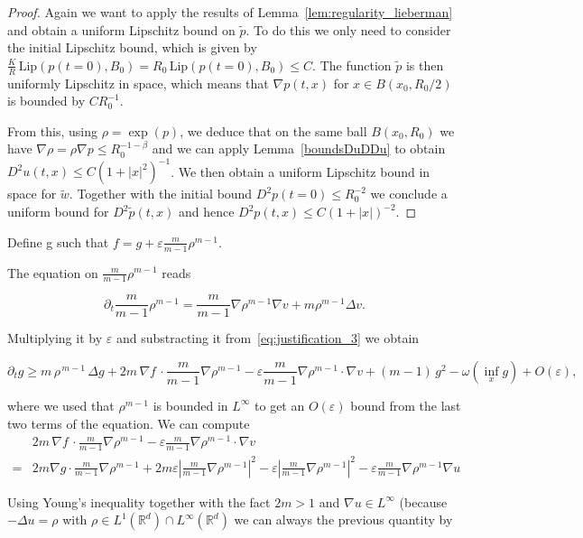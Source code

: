 \documentclass[11pt,a4paper]{article}
\numberwithin{equation}{section}
\newcommand{\R}{{\mathbb{R}}}
\theoremstyle{plain}
\theoremstyle{remark}
\newcommand {\f}{\frac}
\newcommand{\Lip}{\mathrm{Lip}}
\begin{document}
\begin{proof}
Again we want to apply the results of Lemma~\ref{lem:regularity_lieberman} and obtain a uniform Lipschitz bound on $\tilde p$. To do this we only need to consider the initial Lipschitz bound, which is given by $\frac KR\,\Lip(p(t=0), B_0)=R_0\, \Lip(p(t=0), B_0)\leq C$. The function $\tilde p$ is then uniformly Lipschitz in space, which means that $\nabla p(t,x)$ for $x\in B(x_0,R_0/2)$ is bounded by $CR_0^{-1}$.

From this, using $\rho=\exp{(p)}$, we deduce that on the same ball $B(x_0,R_0)$ we have $\nabla \rho=\rho\nabla p\leq R_0^{-1-\beta}$ and we can apply Lemma~\ref{boundsDuDDu}  to obtain $D^2u(t,x)\leq C(1+|x|^2)^{-1}$. We then obtain a uniform Lipschitz bound in space for $\tilde w$. Together with the initial bound $D^2p(t=0)\leq R_0^{-2}$ we conclude a uniform bound for $D^2\tilde p(t,x)$ and hence $D^2 p(t,x)\leq C(1+|x|)^{-2}$.
\qedhere 
\end{proof}


\iffalse

Define g such that $f=g + \varepsilon \f{m}{m-1}\rho^{m-1}$. 

The equation on $\f{m}{m-1}\rho^{m-1}$ reads 

$$
\partial_t \f{m}{m-1}\rho^{m-1} =\f{m}{m-1}\nabla\rho^{m-1}\nabla v + m\rho^{m-1}\Delta v. 
$$

Multiplying it by $\varepsilon$ and substracting it from~\eqref{eq:justification_3} we obtain 

\begin{equation}\label{eq:justificaiton_4}
\partial_t g \ge
  m\,\rho^{\,m-1}\,\Delta g
 +  2m \,\nabla f \,\cdot\f{m}{m-1}\nabla\rho^{m-1}-\varepsilon\f{m}{m-1}\nabla\rho^{m-1}\cdot\nabla v
 + (m-1)\,g^2
  -\omega\left(\inf_{x}g\right) + O(\varepsilon),
\end{equation}

where we used that $\rho^{m-1}$ is bounded in $L^{\infty}$ to get an $O(\varepsilon)$ bound from the last two terms of the equation. We can compute 
\begin{align*}
 &2m \,\nabla f \,\cdot\f{m}{m-1}\nabla\rho^{m-1}-\varepsilon\f{m}{m-1}\nabla\rho^{m-1}\cdot\nabla v
  \\
 =&2m\nabla g\cdot\f{m}{m-1}\nabla\rho^{m-1} + 2m\varepsilon \left|\f{m}{m-1}\nabla \rho^{m-1}\right|^2 -\varepsilon  \left|\f{m}{m-1}\nabla \rho^{m-1}\right|^2 -\varepsilon\f{m}{m-1}\nabla\rho^{m-1}\nabla u
\end{align*}

Using Young's inequality together with the fact $2m>1$ and $\nabla u\in L^{\infty}$ (because $-\Delta u=\rho$ with $\rho\in L^{1}(\R^d)\cap L^{\infty}(\R^d)$ we can always the previous quantity by 
\end{document}
